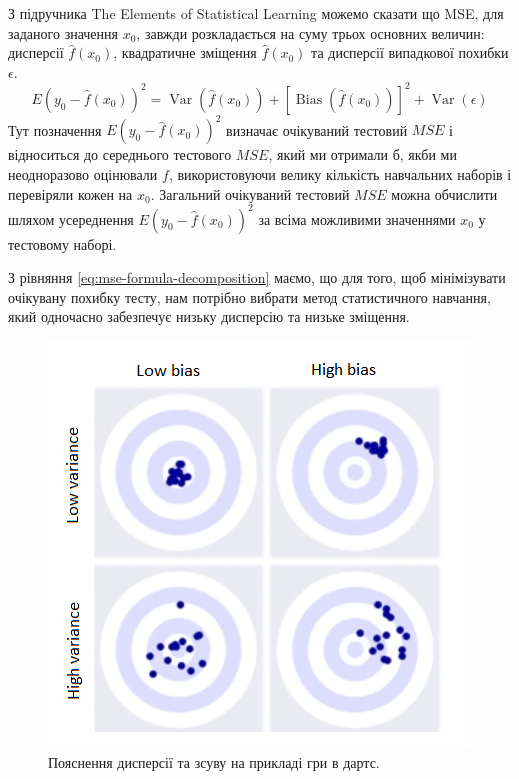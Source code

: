 \documentclass[14pt,a4paper]{extarticle}
\newcounter{e}
\numberwithin{equation}{section}
\numberwithin{figure}{section}
\begin{document}
    З підручника The Elements of Statistical Learning \cite{elements2009} можемо сказати що MSE, для заданого значення $x_{0}$, завжди розкладається на суму трьох основних величин: дисперсії $\hat{f}\left(x_{0}\right)$, квадратичне зміщення $\hat{f}\left(x_{0}\right)$ та дисперсії випадкової похибки $\epsilon$.
    \begin{equation}
        E\left(y_{0}-\hat{f}\left(x_{0}\right)\right)^{2}=\operatorname{Var}\left(\hat{f}\left(x_{ 0}\right)\right)+\left[\operatorname{Bias}\left(\hat{f}\left(x_{0}\right)\right)\right]^{2}+\operatorname{Var }(\epsilon)
    \end{equation}
    Тут позначення $E\left(y_{0}-\hat{f}\left(x_{0}\right)\right)^{2}$ визначає очікуваний тестовий $M S E$ і відноситься до середнього тестового $M S E$, який ми отримали б, якби ми неодноразово оцінювали $f$, використовуючи велику кількість навчальних наборів і перевіряли кожен на $x_{0}$. Загальний очікуваний тестовий $M S E$ можна обчислити шляхом усереднення $E\left(y_{0}-\hat{f}\left(x_{0}\right)\right)^{2}$ за всіма можливими значеннями $x_ {0}$ у тестовому наборі. \newline
    
    З рівняння \ref{eq:mse-formula-decomposition} маємо, що для того, щоб мінімізувати очікувану похибку тесту, нам потрібно вибрати метод статистичного навчання, який одночасно забезпечує низьку дисперсію та низьке зміщення. \newline

    \begin{figure}[h]
        \centering
        \includegraphics[width=0.6 \textwidth]{images/3.png}
        \caption{Пояснення дисперсії та зсуву на прикладі гри в дартс.}
        \label{fig:3}
    \end{figure}
    
\end{document}
